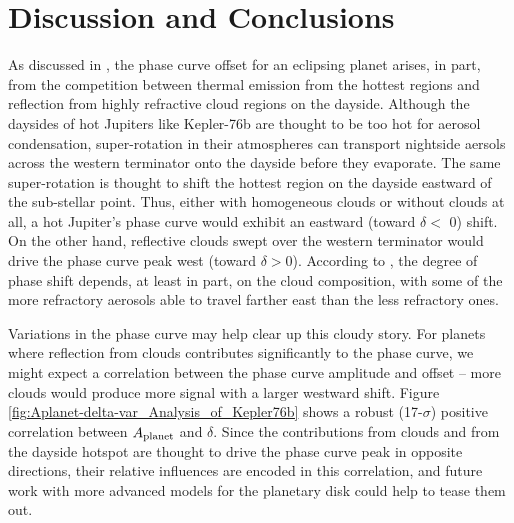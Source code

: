 \documentclass[manuscript]{aastex62}
\begin{document}
\section{Discussion and Conclusions}
\label{sec:Discussion}


As discussed in \citet{2016ApJ...828...22P}, the phase curve offset for an eclipsing planet arises, in part, from the competition between thermal emission from the hottest regions and reflection from highly refractive cloud regions on the dayside. Although the daysides of hot Jupiters like Kepler-76b are thought to be too hot for aerosol condensation, super-rotation in their atmospheres can transport nightside aersols across the western terminator onto the dayside before they evaporate. The same super-rotation is thought to shift the hottest region on the dayside eastward of the sub-stellar point. Thus, either with homogeneous clouds or without clouds at all, a hot Jupiter's phase curve would exhibit an eastward (toward $\delta <$ 0) shift. On the other hand, reflective clouds swept over the western terminator would drive the phase curve peak west (toward $\delta > 0$). According to \citet{2016ApJ...828...22P}, the degree of phase shift depends, at least in part, on the cloud composition, with some of the more refractory aerosols able to travel farther east than the less refractory ones. 

Variations in the phase curve may help clear up this cloudy story. For planets where reflection from clouds contributes significantly to the phase curve, we might expect a correlation between the phase curve amplitude and offset -- more clouds would produce more signal with a larger westward shift. Figure \ref{fig:Aplanet-delta-var_Analysis_of_Kepler76b} shows a robust (17-$\sigma$) positive correlation between $A_{\rm planet}$ and $\delta$. Since the contributions from clouds and from the dayside hotspot are thought to drive the phase curve peak in opposite directions, their relative influences are encoded in this correlation, and future work with more advanced models for the planetary disk \citep[e.g.,][]{2017ascl.soft11019L} could help to tease them out.
\end{document}
